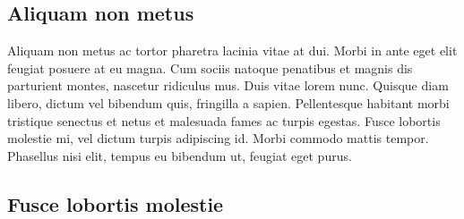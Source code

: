 \subsection{Aliquam non metus}
Aliquam non metus ac tortor pharetra lacinia vitae at dui. Morbi in ante eget elit feugiat posuere at eu magna. Cum sociis natoque penatibus et magnis dis parturient montes, nascetur ridiculus mus. Duis vitae lorem nunc. Quisque diam libero, dictum vel bibendum quis, fringilla a sapien. Pellentesque habitant morbi tristique senectus et netus et malesuada fames ac turpis egestas. Fusce lobortis molestie mi, vel dictum turpis adipiscing id. Morbi commodo mattis tempor. Phasellus nisi elit, tempus eu bibendum ut, feugiat eget purus.


\subsection{Fusce lobortis molestie}

